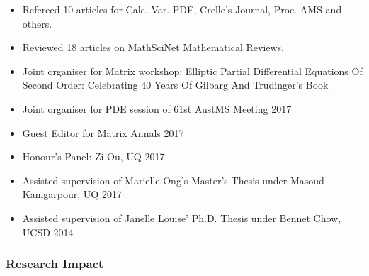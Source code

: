 \documentclass[12pt]{article}
\begin{document}
\begin{itemize}
\item Refereed 10 articles for Calc. Var. PDE, Crelle's Journal, Proc. AMS and others.
\item Reviewed 18 articles on MathSciNet Mathematical Reviews.
\item Joint organiser for Matrix workshop: Elliptic Partial Differential Equations Of Second Order: Celebrating 40 Years Of Gilbarg And Trudinger’s Book
\item Joint organiser for PDE session of 61st AustMS Meeting 2017
\item Guest Editor for Matrix Annals 2017
\item Honour's Panel: Zi Ou, UQ 2017
\item Assisted supervision of Marielle Ong's Master's Thesis under Masoud Kamgarpour, UQ 2017
\item Assisted supervision of Janelle Louise' Ph.D. Thesis under Bennet Chow, UCSD 2014
\end{itemize}

\subsubsection*{Research Impact}
\label{sec:orgheadline7}
\end{document}
